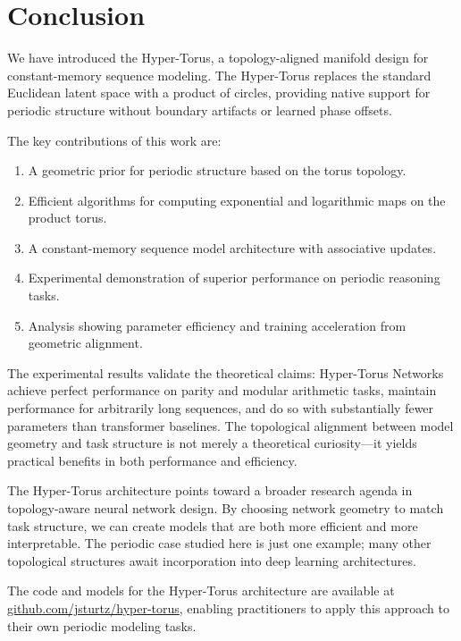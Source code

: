 \documentclass[12pt,letterpaper,twoside]{article}
\begin{document}
\section{Conclusion}
We have introduced the Hyper-Torus, a topology-aligned manifold design for constant-memory sequence modeling. The Hyper-Torus replaces the standard Euclidean latent space with a product of circles, providing native support for periodic structure without boundary artifacts or learned phase offsets.

The key contributions of this work are:
\begin{enumerate}
    \item A geometric prior for periodic structure based on the torus topology.
    \item Efficient algorithms for computing exponential and logarithmic maps on the product torus.
    \item A constant-memory sequence model architecture with associative updates.
    \item Experimental demonstration of superior performance on periodic reasoning tasks.
    \item Analysis showing parameter efficiency and training acceleration from geometric alignment.
\end{enumerate}

The experimental results validate the theoretical claims: Hyper-Torus Networks achieve perfect performance on parity and modular arithmetic tasks, maintain performance for arbitrarily long sequences, and do so with substantially fewer parameters than transformer baselines. The topological alignment between model geometry and task structure is not merely a theoretical curiosity—it yields practical benefits in both performance and efficiency.

The Hyper-Torus architecture points toward a broader research agenda in topology-aware neural network design. By choosing network geometry to match task structure, we can create models that are both more efficient and more interpretable. The periodic case studied here is just one example; many other topological structures await incorporation into deep learning architectures.

The code and models for the Hyper-Torus architecture are available at \url{github.com/jsturtz/hyper-torus}, enabling practitioners to apply this approach to their own periodic modeling tasks.

% 
% 
\end{document}
